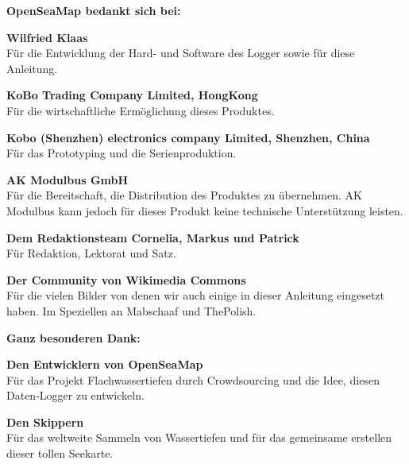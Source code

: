 \documentclass[pdftex, fontsize=8pt, paper=130mm:92mm,pagesize]{scrartcl}
\begin{document}
\textbf{OpenSeaMap bedankt sich bei:}

\textbf{Wilfried Klaas}\\
Für die Entwicklung der Hard- und Software des Logger sowie für diese Anleitung.

\textbf{KoBo Trading Company Limited, HongKong}\\
Für die wirtschaftliche Ermöglichung dieses Produktes.

\textbf{Kobo (Shenzhen) electronics company Limited, Shenzhen, China}\\
Für das Prototyping und die Serienproduktion.

\textbf{AK Modulbus GmbH}\\
Für die Bereitschaft, die Distribution des Produktes zu übernehmen. AK Modulbus kann jedoch für dieses Produkt keine technische Unterstützung leisten.

\textbf{Dem Redaktionsteam Cornelia, Markus und Patrick}\\
Für Redaktion, Lektorat und Satz.
\newpage

\textbf{Der Community von Wikimedia Commons}\\
Für die vielen Bilder von denen wir auch einige in dieser Anleitung eingesetzt haben. Im Speziellen an Mabschaaf und ThePolish.

\vspace{2.5cm}

\textbf{Ganz besonderen Dank:}

\textbf{Den Entwicklern von OpenSeaMap}\\
Für das Projekt \glqq Flachwassertiefen durch Crowdsourcing\grqq{} und die Idee, diesen Daten-Logger zu entwickeln.

\textbf{Den Skippern}\\
Für das weltweite Sammeln von Wassertiefen und für das gemeinsame erstellen dieser tollen Seekarte.

\newpage
\thispagestyle{empty}
\hspace{1cm} 
\newpage
\thispagestyle{empty}
\hspace{1cm} 
\end{document}
